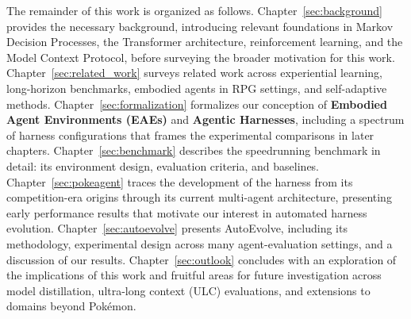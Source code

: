 The remainder of this work is organized as follows. Chapter~\ref{sec:background} provides the necessary background, introducing relevant foundations in Markov Decision Processes, the Transformer architecture, reinforcement learning, and the Model Context Protocol, before surveying the broader motivation for this work. Chapter~\ref{sec:related_work} surveys related work across experiential learning, long-horizon benchmarks, embodied agents in RPG settings, and self-adaptive methods. Chapter~\ref{sec:formalization} formalizes our conception of \textbf{Embodied Agent Environments (EAEs)} and \textbf{Agentic Harnesses}, including a spectrum of harness configurations that frames the experimental comparisons in later chapters. Chapter~\ref{sec:benchmark} describes the speedrunning benchmark in detail: its environment design, evaluation criteria, and baselines. Chapter~\ref{sec:pokeagent} traces the development of the \pokeagent{} harness from its competition-era origins through its current multi-agent architecture, presenting early performance results that motivate our interest in automated harness evolution. Chapter~\ref{sec:autoevolve} presents AutoEvolve, including its methodology, experimental design across many agent-evaluation settings, and a discussion of our results. Chapter~\ref{sec:outlook} concludes with an exploration of the implications of this work and fruitful areas for future investigation across model distillation, ultra-long context (ULC) evaluations, and extensions to domains beyond Pok\'{e}mon.
